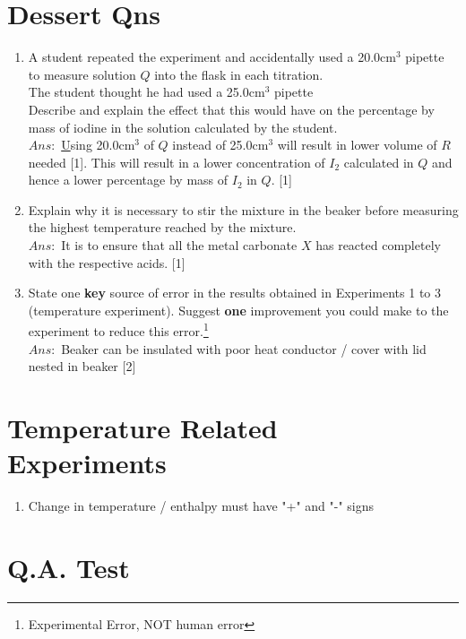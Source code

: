 \documentclass[oneside]{book}
\begin{document}
\chapter{Dessert Qns}
\begin{enumerate}
    \item A student repeated the experiment and accidentally used a 20.0cm\(^3\) pipette to measure solution \(Q\) into the flask in each titration.\\
    The student thought he had used a 25.0cm\(^3\) pipette\\
    Describe and explain the effect that this would have on the percentage by mass of iodine in the solution calculated by the student.\\[2mm]
    \(Ans:\) \underline Using 20.0cm\(^3\) of \(Q\) instead of 25.0cm\(^3\) will result in lower volume of \(R\) needed [1]. This will result in a lower concentration of \(I_2\) calculated in \(Q\) and hence a lower percentage by mass of \(I_2\) in \(Q\). [1]
    \item Explain why it is necessary to stir the mixture in the beaker before measuring the highest temperature reached by the mixture.\\[2mm]
    \(Ans:\) It is to ensure that all the metal carbonate \(X\) has reacted completely with the respective acids. [1]
    \item State one \textbf{key} source of error in the results obtained in Experiments 1 to 3 (temperature experiment). Suggest \textbf{one} improvement you could make to the experiment to reduce this error.\footnote{Experimental Error, NOT human error}\\[2mm]
    \(Ans:\) Beaker can be insulated with poor heat conductor / cover with lid nested in beaker [2]
\end{enumerate}
\newpage
\chapter{Temperature Related\\ Experiments}
\begin{enumerate}
    \item Change in temperature / enthalpy must have "+" and "-" signs
\end{enumerate}
\chapter{Q.A. Test}
\end{document}
